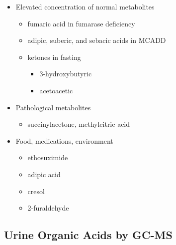 \documentclass{scrartcl}
\begin{document}
\begin{enumerate}
\begin{itemize}
\item Elevated concentration of normal metabolites
\begin{itemize}
\item fumaric acid in fumarase deficiency
\item adipic, suberic, and sebacic acids in MCADD
\item ketones in fasting
\begin{itemize}
\item 3-hydroxybutyric
\item acetoacetic
\end{itemize}
\end{itemize}

\item Pathological metabolites
\begin{itemize}
\item succinylacetone, methylcitric acid
\end{itemize}

\item Food, medications, environment
\begin{itemize}
\item ethosuximide
\item adipic acid
\item cresol
\item 2-furaldehyde
\end{itemize}
\end{itemize}
\end{enumerate}


\subsection{Urine Organic Acids by GC-MS}
\label{sec:org283feb3}
\end{document}
